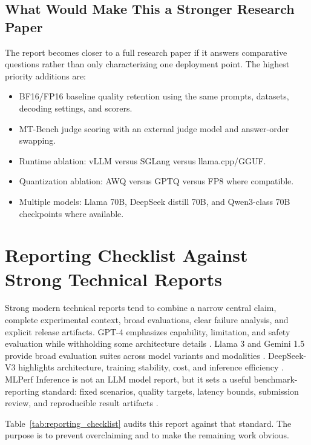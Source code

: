 \documentclass[11pt]{article}
\begin{document}
\subsection{What Would Make This a Stronger Research Paper}

The report becomes closer to a full research paper if it answers comparative
questions rather than only characterizing one deployment point. The highest
priority additions are:

\begin{itemize}
  \item BF16/FP16 baseline quality retention using the same prompts, datasets,
        decoding settings, and scorers.
  \item MT-Bench judge scoring with an external judge model and answer-order
        swapping.
  \item Runtime ablation: vLLM versus SGLang versus llama.cpp/GGUF.
  \item Quantization ablation: AWQ versus GPTQ versus FP8 where compatible.
  \item Multiple models: Llama 70B, DeepSeek distill 70B, and Qwen3-class 70B
        checkpoints where available.
\end{itemize}

\section{Reporting Checklist Against Strong Technical Reports}

Strong modern technical reports tend to combine a narrow central claim, complete
experimental context, broad evaluations, clear failure analysis, and explicit
release artifacts. GPT-4 emphasizes capability, limitation, and safety
evaluation while withholding some architecture details \cite{gpt4_report}.
Llama 3 and Gemini 1.5 provide broad evaluation suites across model variants and
modalities \cite{llama3_report,gemini15_report}. DeepSeek-V3 highlights
architecture, training stability, cost, and inference efficiency
\cite{deepseekv3_report}. MLPerf Inference is not an LLM model report, but it
sets a useful benchmark-reporting standard: fixed scenarios, quality targets,
latency bounds, submission review, and reproducible result artifacts
\cite{mlperf_inference}.

Table~\ref{tab:reporting_checklist} audits this report against that standard.
The purpose is to prevent overclaiming and to make the remaining work obvious.
\end{document}
